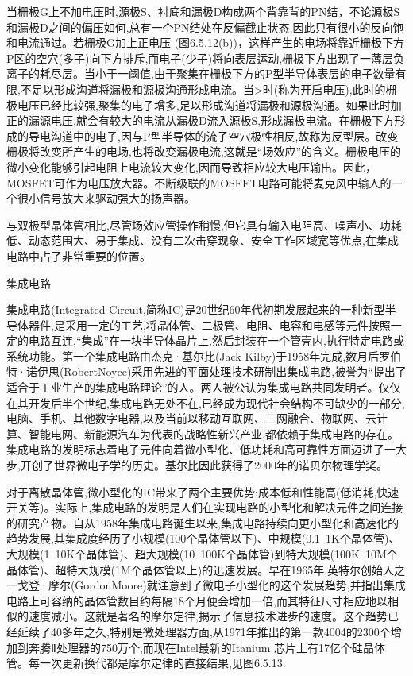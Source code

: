 当栅极G上不加电压时,源极S、衬底和漏极D构成两个背靠背的PN结，不论源极S和漏极D之间的偏压如何,总有一个PN结处在反偏截止状态,因此只有很小的反向饱和电流通过。若栅极G加上正电压 (图6.5.12(b))，这样产生的电场将靠近栅极下方P区的空穴(多子)向下方排斥,而电子(少子)将向表层运动,栅极下方出现了一薄层负离子的耗尽层。当小于一阈值,由于聚集在栅极下方的P型半导体表层的电子数量有限,不足以形成沟道将漏极和源极沟通形成电流。当>时(称为开启电压),此时的栅极电压已经比较强,聚集的电子增多,足以形成沟道将漏极和源极沟通。如果此时加正的漏源电压,就会有较大的电流从漏极D流入源极S,形成漏极电流。在栅极下方形成的导电沟道中的电子,因与P型半导体的流子空穴极性相反,故称为反型层。改变栅极将改变所产生的电场,也将改变漏极电流,这就是“场效应”的含义。栅极电压的微小变化能够引起电阻上电流较大变化,因而导致相应较大电压输出。因此，MOSFET可作为电压放大器。不断级联的MOSFET电路可能将麦克风中输人的一个很小信号放大来驱动强大的扬声器。

与双极型晶体管相比,尽管场效应管操作稍慢,但它具有输入电阻高、噪声小、功耗低、动态范围大、易于集成、没有二次击穿现象、安全工作区域宽等优点,在集成电路中占了非常重要的位置。

集成电路

集成电路(Integrated Circuit,简称IC)是20世纪60年代初期发展起来的一种新型半导体器件,是采用一定的工艺,将晶体管、二极管、电阻、电容和电感等元件按照一定的电路互连,“集成”在一块半导体晶片上,然后封装在一个管壳内,执行特定电路或系统功能。第一个集成电路由杰克·基尔比(Jack Kilby)于1958年完成,数月后罗伯特·诺伊思(RobertNoyce)采用先进的平面处理技术研制出集成电路,被誉为“提出了适合于工业生产的集成电路理论”的人。两人被公认为集成电路共同发明者。仅仅在其开发后半个世纪,集成电路无处不在,已经成为现代社会结构不可缺少的一部分,电脑、手机、其他数字电器,以及当前以移动互联网、三网融合、物联网、云计算、智能电网、新能源汽车为代表的战略性新兴产业,都依赖于集成电路的存在。集成电路的发明标志着电子元件向着微小型化、低功耗和高可靠性方面迈进了一大步,开创了世界微电子学的历史。基尔比因此获得了2000年的诺贝尔物理学奖。

对于离散晶体管,微小型化的IC带来了两个主要优势:成本低和性能高(低消耗,快速开关等)。实际上,集成电路的发明是人们在实现电路的小型化和解决元件之间连接的研究产物。自从1958年集成电路诞生以来,集成电路持续向更小型化和高速化的趋势发展,其集成度经历了小规模(100个晶体管以下)、中规模(0.1~1K个晶体管)、大规模(1~10K个晶体管)、超大规模(10~100K个晶体管)到特大规模(100K~10M个晶体管)、超特大规模(1M个晶体管以上)的迅速发展。早在1965年,英特尔创始人之一戈登·摩尔(GordonMoore)就注意到了微电子小型化的这个发展趋势,并指出集成电路上可容纳的晶体管数目约每隔18个月便会增加一倍,而其特征尺寸相应地以相似的速度减小。这就是著名的摩尔定律,揭示了信息技术进步的速度。这个趋势已经延续了40多年之久,特别是微处理器方面,从1971年推出的第一款4004的2300个增加到奔腾Ⅱ处理器的750万个,而现在Intel最新的Itanium 芯片上有17亿个硅晶体管。每一次更新换代都是摩尔定律的直接结果,见图6.5.13.



